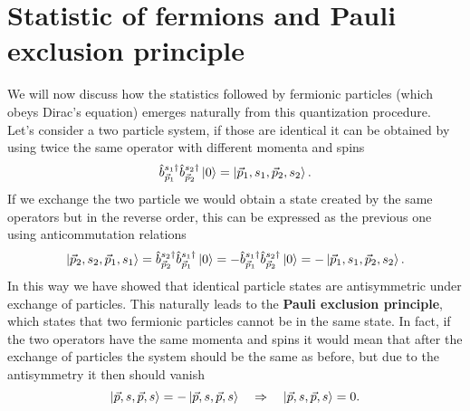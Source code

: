 \section{Statistic of fermions and Pauli exclusion principle}
We will now discuss how the statistics followed by fermionic particles (which obeys Dirac's equation) emerges naturally from this quantization procedure.\\Let's consider a two particle system, if those are identical it can be obtained by using twice the same operator with different momenta and spins
\begin{equation*}
    \hat{b}^{s_1\dagger}_{\vec p_1}\hat{b}^{s_2\dagger}_{\vec p_2}\ket{0}=\ket{\vec p_1,s_1,\vec p_2,s_2}.
\end{equation*} 
If we exchange the two particle we would obtain a state created by the same operators but in the reverse order, this can be expressed as the previous one using anticommutation relations
\begin{equation*}
    \ket{\vec p_2,s_2,\vec p_1,s_1}=\hat{b}^{s_2\dagger}_{\vec p_2}\hat{b}^{s_1\dagger}_{\vec p_1}\ket{0}=-\hat{b}^{s_1\dagger}_{\vec p_1}\hat{b}^{s_2\dagger}_{\vec p_2}\ket{0}=-\ket{\vec p_1,s_1,\vec p_2,s_2}.
\end{equation*} 
In this way we have showed that identical particle states are antisymmetric under exchange of particles. This naturally leads to the \textbf{Pauli exclusion principle}, which states that two fermionic particles cannot be in the same state. In fact, if the two operators have the same momenta and spins it would mean that after the exchange of particles the system should be the same as before, but due to the antisymmetry it then should vanish
\begin{equation*}
    \ket{\vec p,s,\vec p,s}=- \ket{\vec p,s,\vec p,s}\quad\Rightarrow\quad \ket{\vec p,s,\vec p,s}=0.
\end{equation*}
